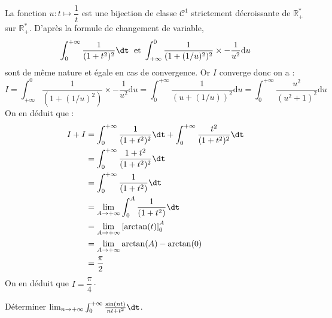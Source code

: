 \documentclass[a4paper,10pt]{report}
\begin{document}
\noindent La fonction $u : t \mapsto \dfrac{1}{t}$ est une bijection de classe $\mathcal{C}^1$ strictement décroissante de $\mathbb{R}_+^*$ sur $\mathbb{R}_+^*$. D'après la formule de changement de variable,
$$ \int_0^{+ \infty}  \frac{1}{(1 + t^{2})^{2}} \dt \; \hbox{ et } \int_{+ \infty}^0 \dfrac{1}{(1+(1/u)^2)^2} \times -\dfrac{1}{u^2} \textrm{d}u$$
sont de même nature et égale en cas de convergence. Or $I$ converge donc on a :
$$ I = \int_{+ \infty}^0 \dfrac{1}{(1+(1/u)^2)} \times -\dfrac{1}{u^2} \textrm{d}u = \int_{0}^{+ \infty} \dfrac{1}{(u+(1/u))^2}  \textrm{d}u    =    \int_{0}^{+ \infty} \dfrac{u^2}{(u^2+1)^2}  \textrm{d}u $$
On en déduit que :
\begin{align*}
I+I & = \int_0^{+ \infty}  \frac{1}{(1 + t^{2})^{2}} \dt + \int_0^{+ \infty}  \frac{t^2}{(1 + t^{2})^{2}} \dt\\
& = \int_0^{+ \infty}  \frac{1+t^2}{(1 + t^{2})^{2}} \dt \\
& = \int_0^{+ \infty}  \frac{1}{(1 + t^{2})} \dt \\
& = \lim_{A \rightarrow + \infty} \int_0^{A}  \frac{1}{(1 + t^{2})} \dt \\
& = \lim_{A \rightarrow + \infty} \left[ \arctan(t) \right]_0^A \\
& = \lim_{A \rightarrow + \infty} \arctan(A)- \arctan(0) \\
& = \dfrac{\pi}{2}
\end{align*}
On en déduit que $I = \dfrac{\pi}{4} \cdot$

\begin{Exa} Déterminer $\lim_{n \to + \infty} \int_{0}^{ + \infty} \frac{\sin(nt)}{nt + t^{2}} \dt$.
\end{Exa}
\end{document}
